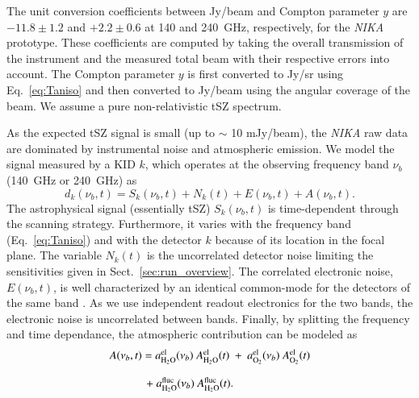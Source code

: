 The unit conversion coefficients between Jy/beam and Compton parameter $y$ are $-11.8 \pm 1.2$ and $+ 2.2 \pm 0.6$ at 140 and 240~GHz, respectively, for the {\it NIKA} prototype. These coefficients are computed by taking the overall transmission of the instrument and the measured total beam with their respective errors into account. The Compton parameter $y$ is first converted to Jy/sr using Eq.~\ref{eq:Taniso} and then converted to Jy/beam using the angular coverage of the beam. We assume a pure non-relativistic tSZ spectrum.

As the expected tSZ signal is small (up to $\sim$ 10 mJy/beam), the {\it NIKA} raw data are dominated by instrumental noise and atmospheric emission. We model the signal measured by a KID $k$, which operates at the observing frequency band $\nu_b$ (140~GHz or 240~GHz) as
   \begin{equation}
	d_k(\nu_b, t) = S_k(\nu_b, t) + N_k(t) + E(\nu_b, t) + A(\nu_b, t).
	\label{eq:signal_and_noise}
   \end{equation}
The astrophysical signal (essentially tSZ) $S_k(\nu_b, t)$ is time-dependent through the scanning strategy. Furthermore, it varies with the frequency band (Eq.~\ref{eq:Taniso}) and with the detector $k$ because of its location in the focal plane. The variable $N_k(t)$ is the uncorrelated detector noise limiting the sensitivities given in Sect.~\ref{sec:run_overview}. The correlated electronic noise, $E(\nu_b, t)$, is well characterized by an identical common-mode for the detectors of the same band \citep{NIKEL}. As we use independent readout electronics for the two bands, the electronic noise is uncorrelated between bands. Finally, by splitting the frequency and time dependance, the atmospheric contribution can be modeled as
   \begin{equation}
   	\begin{array}{lcr}
	A(\nu_b, t) = a_{\mathrm{H}_2\mathrm{O}} ^{\mathrm{el}} (\nu_b) \ A_{\mathrm{H}_2\mathrm{O}}^{\mathrm{el}} (t) \ + \ a_{\mathrm{O}_2} ^{\mathrm{el}} (\nu_b) \ A_{\mathrm{O}_2}^{\mathrm{el}} (t) \\
\\
\hspace*{1.15cm}	+ \  a_{\mathrm{H}_2\mathrm{O}} ^{\mathrm{fluc}} (\nu_b) \  A_{\mathrm{H}_2\mathrm{O}}^{\mathrm{fluc}} (t).\\
	\end{array}
	\label{eq:atmosphere}
   \end{equation}
